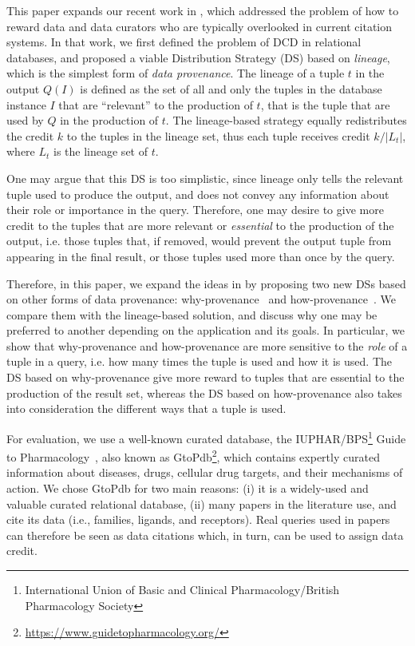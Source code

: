 \vspace{0.15in}

This paper expands our recent work in \citep{dosso2020data}, which addressed the problem of how to reward data and data curators who are typically overlooked in current citation systems.
In that work, we first defined the problem of DCD in relational databases, and proposed a viable Distribution Strategy (DS) based on \emph{lineage}, which is the simplest form of \emph{data provenance}. The lineage of a tuple $t$ in the output $Q(I)$ is defined as the set of all and only the tuples in the database instance $I$ that are ``relevant'' to the production of $t$, that is the tuple that are used by $Q$ in the production of $t$.
The lineage-based strategy equally redistributes the credit $k$ to the tuples in the lineage set, thus each tuple receives credit $k/|L_t|$, where $L_t$ is the lineage set of $t$. 

One may argue that this DS is too simplistic, since lineage only tells the relevant tuple used to produce the output, and does not convey any information about their role or importance in the query.
Therefore, one may desire to give more credit to the tuples that are more relevant or {\em essential} to the production of the output, i.e. those tuples that, if removed, would prevent the output tuple from appearing in the final result, or those tuples used more than once  by the query. 

Therefore, in this paper, we expand the ideas in \citep{dosso2020data} by proposing two new DSs based on other forms of data provenance: why-provenance~\citep{WhyProvBuneman} and how-provenance~\citep{howProvenanceGreen}. 
We compare them with the lineage-based solution, and discuss why one may be preferred to another depending on the application and its goals. 
In particular, we show that why-provenance and how-provenance are more sensitive to the {\em role} of a tuple in a query, i.e. how many times the tuple is used and how it is used. 
The DS based on why-provenance give more reward to tuples that are essential to the production of the result set, whereas the DS based on how-provenance also takes into consideration the different ways that a tuple is used. 

For evaluation, we use a well-known curated database, the IUPHAR/BPS\footnote{International Union of Basic and Clinical Pharmacology/British Pharmacology Society} Guide to Pharmacology~\citep{iuphar2018}, also known as GtoPdb\footnote{\url{https://www.guidetopharmacology.org/}}, which contains expertly curated information about diseases, drugs, cellular drug targets, and their mechanisms of action.
We chose GtoPdb for two main reasons: (i) it is a widely-used and valuable curated relational database, (ii) many papers in the literature use, and cite its data (i.e., families, ligands, and receptors). 
Real queries used in papers can therefore be seen as data citations which, in turn, can be used to assign data credit.

